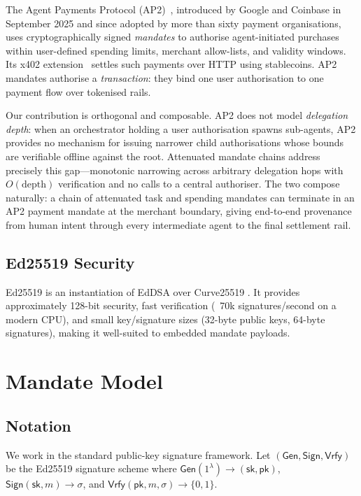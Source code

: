 \documentclass[conference]{IEEEtran}
\newcommand{\pk}{\mathsf{pk}}
\newcommand{\sk}{\mathsf{sk}}
\newcommand{\sig}{\sigma}
\newcommand{\Sign}{\mathsf{Sign}}
\newcommand{\Vrfy}{\mathsf{Vrfy}}
\newcommand{\Gen}{\mathsf{Gen}}
\begin{document}
The Agent Payments Protocol (AP2)~\cite{google2025ap2},
introduced by Google and Coinbase in September 2025 and since
adopted by more than sixty payment organisations, uses
cryptographically signed \emph{mandates} to authorise
agent-initiated purchases within user-defined spending limits,
merchant allow-lists, and validity windows.  Its x402
extension~\cite{coinbase2025x402} settles such payments over
HTTP using stablecoins.  AP2 mandates authorise a
\emph{transaction}: they bind one user authorisation to one
payment flow over tokenised rails.

Our contribution is orthogonal and composable.  AP2 does not
model \emph{delegation depth}: when an orchestrator holding a
user authorisation spawns sub-agents, AP2 provides no
mechanism for issuing narrower child authorisations whose
bounds are verifiable offline against the root.  Attenuated
mandate chains address precisely this gap---monotonic
narrowing across arbitrary delegation hops with
$O(\mathrm{depth})$ verification and no calls to a central
authoriser.  The two compose naturally: a chain of attenuated
task and spending mandates can terminate in an AP2 payment
mandate at the merchant boundary, giving end-to-end provenance
from human intent through every intermediate agent to the
final settlement rail.

\subsection{Ed25519 Security}

Ed25519 \cite{bernstein2011ed25519} is an instantiation of
EdDSA \cite{josefsson2017ed25519rfc} over Curve25519
\cite{langley2016curve25519}.  It provides approximately
128-bit security, fast verification (~70k signatures/second
on a modern CPU), and small key/signature sizes (32-byte
public keys, 64-byte signatures), making it well-suited to
embedded mandate payloads.

\section{Mandate Model}
\label{sec:model}

\subsection{Notation}

We work in the standard public-key signature framework.
Let $(\Gen, \Sign, \Vrfy)$ be the Ed25519 signature scheme
where $\Gen(1^\lambda) \to (\sk, \pk)$, $\Sign(\sk, m) \to
\sig$, and $\Vrfy(\pk, m, \sig) \to \{0,1\}$.
\end{document}
